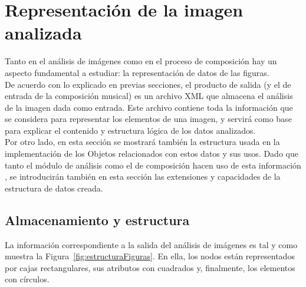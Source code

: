 \section{Representación de la imagen analizada}
\label{sec:representacionFiguras}

Tanto en el análisis de imágenes como en el proceso de composición hay un aspecto fundamental a estudiar: la representación de datos de las figuras.\\

De acuerdo con lo explicado en previas secciones, el producto de salida  (y el de entrada de la composición musical) es un archivo XML que almacena el análisis de la imagen dada como entrada. Este archivo contiene toda la información que se considera para representar los elementos de una imagen, y servirá como base para explicar el contenido y estructura lógica de los datos analizados.\\

Por otro lado, en esta sección se mostrará también la estructura usada en la implementación de los Objetos relacionados con estos datos y sus usos. Dado que tanto el módulo de análisis como el de composición hacen uso de esta información , se introducirán también en esta sección las extensiones y capacidades de la estructura de datos creada.

\subsection{Almacenamiento y estructura}
\label{subsec:xmlstruct}

	La información correspondiente a la salida del análisis de imágenes es tal y como muestra la Figura~\ref{fig:estructuraFiguras}. En ella, los nodos están representados por cajas rectangulares, sus atributos con cuadrados y, finalmente, los elementos con círculos. \\

